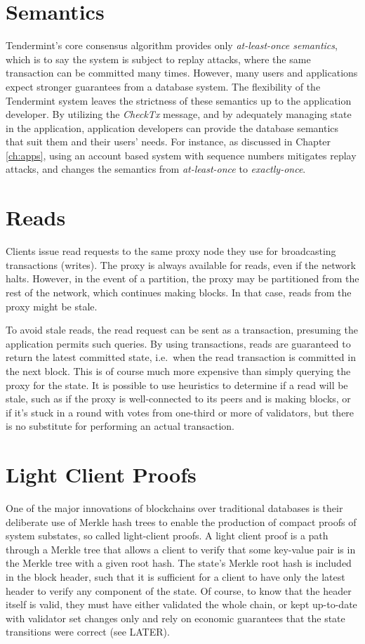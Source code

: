 \section{Semantics}

Tendermint's core consensus algorithm provides only \emph{at-least-once semantics}, 
which is to say the system is subject to replay attacks, 
where the same transaction can be committed many times.
However, many users and applications expect stronger guarantees from a database system.
The flexibility of the Tendermint system leaves the strictness of these semantics up to the application developer.
By utilizing the \emph{CheckTx} message, and by adequately managing state in the application, 
application developers can provide the database semantics that suit them and their users' needs.
For instance, as discussed in Chapter \ref{ch:apps}, 
using an account based system with sequence numbers mitigates replay attacks,
and changes the semantics from \emph{at-least-once} to \emph{exactly-once}.

\section{Reads} 

Clients issue read requests to the same proxy node they use for broadcasting transactions (writes).
The proxy is always available for reads, even if the network halts.
However, in the event of a partition, the proxy may be partitioned from the rest of the network, which continues making blocks.
In that case, reads from the proxy might be stale.

To avoid stale reads, the read request can be sent as a transaction, presuming the application permits such queries.
By using transactions, reads are guaranteed to return the latest committed state, i.e.~when the read transaction is committed in the next block.
This is of course much more expensive than simply querying the proxy for the state.
It is possible to use heuristics to determine if a read will be stale,
such as if the proxy is well-connected to its peers and is making blocks, 
or if it's stuck in a round with votes from one-third or more of validators,
but there is no substitute for performing an actual transaction.

\section{Light Client Proofs}

One of the major innovations of blockchains over traditional databases is their deliberate use of Merkle hash trees to enable the production
of compact proofs of system substates, so called light-client proofs.
A light client proof is a path through a Merkle tree that allows a client to verify that some key-value pair is in the Merkle tree with a given root hash.
The state's Merkle root hash is included in the block header, such that it is sufficient for a client to have only the latest header to verify any component of the state.
Of course, to know that the header itself is valid, they must have either validated the whole chain, 
or kept up-to-date with validator set changes only and rely on economic guarantees that the state transitions were correct (see LATER).


